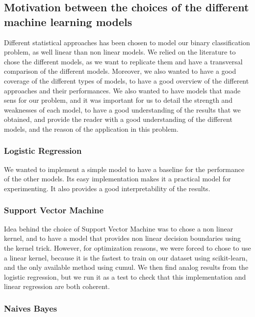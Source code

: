 \documentclass{article}
\begin{document}
    \subsection{Motivation between the choices of the different machine learning models}\label{subsec:motivation-between-the-choices-of-the-different-machine-learning-models2}

    Different statistical approaches has been chosen to model our binary classification problem, as well linear than non linear models.
    We relied on the literature to chose the different models, as we want to replicate them and have a transversal comparison of the different models.
    Moreover, we also wanted to have a good coverage of the different types of models, to have a good overview of the different approaches and their performances.
    We also wanted to have models that made sens for our problem, and it was important for us to detail the strength and weaknesses of each model, to have a good understanding of the results that we obtained, and provide the reader with a good understanding of the different models, and the reason of the application in this problem.

    \subsubsection{Logistic Regression}
    We wanted to implement a simple model to have a baseline for the performance of the other models.
    Its easy implementation makes it a practical model for experimenting.
    It also provides a good interpretability of the results.

    \subsubsection{Support Vector Machine}\label{subsubsec:support-vector-machine}
    Idea behind the choice of Support Vector Machine was to chose a non linear kernel, and to have a model that provides non linear decision boundaries using the kernel trick.
    However, for optimization reasons, we were forced to chose to use a linear kernel, because it is the fastest to train on our dataset using scikit-learn, and the only available method using cumul.
    We then find analog results from the logistic regression, but we run it as a test to check that this implementation and linear regression are both coherent.

    \subsubsection{Naives Bayes}
\end{document}
